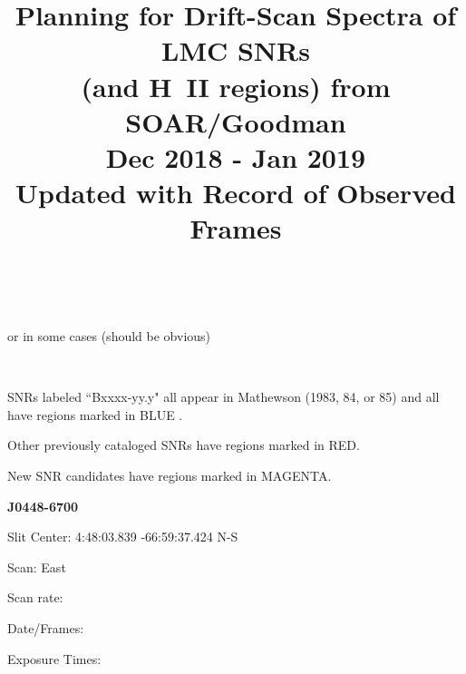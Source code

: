 \documentclass[11pt]{article}
\title{\bf Planning for Drift-Scan Spectra of LMC SNRs \\
(and H~II regions) from SOAR/Goodman \\
Dec 2018 - Jan 2019\\
Updated with Record of Observed Frames}
\date{}                                           %
\begin{document}
\maketitle
\vspace{1in}

\vspace{2 mm}
\
\vspace{1cm}

\quad\quad\quad or in some cases (should be obvious)

\vspace{0.5cm}
\vspace{2 mm}
\

\vspace{0.5cm}


\textbullet \quad SNRs labeled ``Bxxxx-yy.y" all appear in Mathewson (1983, 84, or 85) and all have regions marked in BLUE .

\textbullet \quad Other previously cataloged SNRs have regions marked in RED.

\textbullet \quad New SNR candidates have regions marked in MAGENTA.

\newpage
{\bf J0448-6700}

Slit Center:   4:48:03.839        -66:59:37.424      N-S

Scan:  East

Scan rate:  

Date/Frames:

Exposure Times:  
\end{document}
